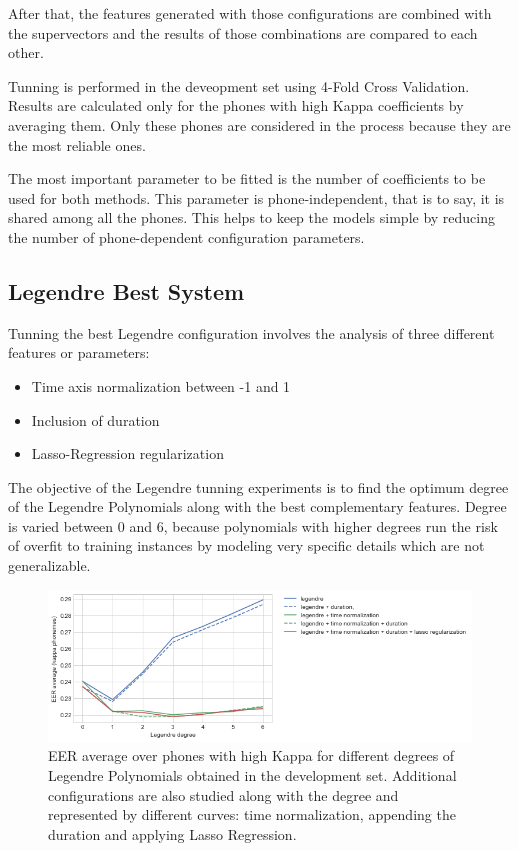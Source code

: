 After that, the features generated with those configurations are combined with
the supervectors and the results of those combinations are compared to each other.

Tunning is performed in the deveopment set using 4-Fold Cross Validation. Results are
calculated only for the phones with high Kappa coefficients by averaging them.
Only these phones are considered in the process because they are the most reliable ones.

The most important parameter to be fitted is the number of coefficients to be used
for both methods. This parameter is phone-independent, that is to say, it is shared
among all the phones. This helps to keep
the models simple by reducing the number of phone-dependent configuration parameters.

\subsection{Legendre Best System}

Tunning the best Legendre configuration involves the analysis of three different
features or parameters:

\begin{itemize}
	\item Time axis normalization between -1 and 1
	\item Inclusion of duration
	\item Lasso-Regression regularization
\end{itemize}

The objective of the Legendre tunning experiments is to find the optimum degree of the Legendre
Polynomials along with the best complementary features. Degree is varied between 0 and 6,
because polynomials with
higher degrees run the risk of overfit to training instances by modeling very specific
details which are not generalizable.


\begin{figure}[H]
	\centering
	\includegraphics[width=1.0\textwidth]{files/figures/results/legendre-dct/legendre-tunning.png}
	\caption{EER average over phones with high Kappa for different
	degrees of Legendre Polynomials obtained in
	the development set. Additional configurations are also studied along with the degree and
	represented by different curves: time normalization, appending the duration and applying
	Lasso Regression.}
	\label{fig:legendreTunning}
\end{figure}

